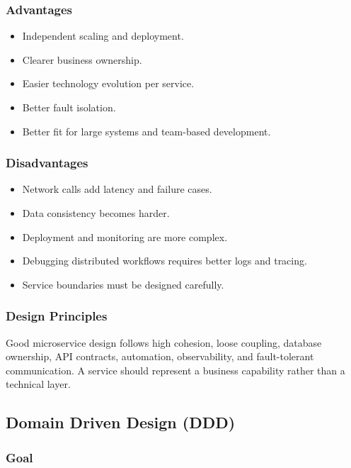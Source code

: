 \documentclass[12pt,a4paper]{article}
\begin{document}
\subsubsection{Advantages}

\begin{itemize}
    \item Independent scaling and deployment.
    \item Clearer business ownership.
    \item Easier technology evolution per service.
    \item Better fault isolation.
    \item Better fit for large systems and team-based development.
\end{itemize}

\subsubsection{Disadvantages}

\begin{itemize}
    \item Network calls add latency and failure cases.
    \item Data consistency becomes harder.
    \item Deployment and monitoring are more complex.
    \item Debugging distributed workflows requires better logs and tracing.
    \item Service boundaries must be designed carefully.
\end{itemize}

\subsubsection{Design Principles}

Good microservice design follows high cohesion, loose coupling, database ownership, API contracts, automation, observability, and fault-tolerant communication. A service should represent a business capability rather than a technical layer.

\subsection{Domain Driven Design (DDD)}

\subsubsection{Goal}
\end{document}
